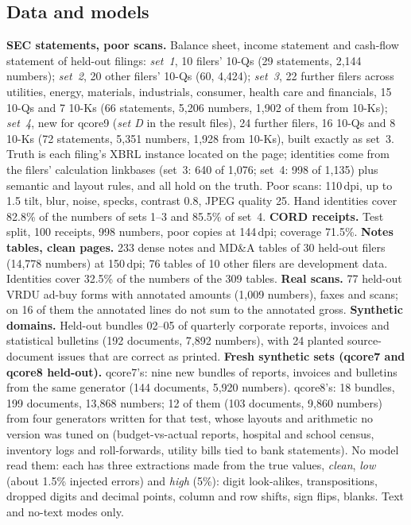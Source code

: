 \documentclass[10pt,twocolumn]{article}
\newcommand{\vq}[1]{\textsf{qcore#1}}
\begin{document}
\subsection{Data and models}
\textbf{SEC statements, poor scans.} Balance sheet, income statement and cash-flow statement of held-out filings: \emph{set~1}, 10 filers' 10-Qs (29 statements, 2,144 numbers); \emph{set~2}, 20 other filers' 10-Qs (60, 4,424); \emph{set~3}, 22 further filers across utilities, energy, materials, industrials, consumer, health care and financials, 15 10-Qs and 7 10-Ks (66 statements, 5,206 numbers, 1,902 of them from 10-Ks); \emph{set~4}, new for \vq{9} (\emph{set D} in the result files), 24 further filers, 16 10-Qs and 8 10-Ks (72 statements, 5,351 numbers, 1,928 from 10-Ks), built exactly as set~3. Truth is each filing's XBRL instance located on the page; identities come from the filers' calculation linkbases (set~3: 640 of 1,076; set~4: 998 of 1,135) plus semantic and layout rules, and all hold on the truth. Poor scans: 110\,dpi, up to 1.5\textdegree{} tilt, blur, noise, specks, contrast 0.8, JPEG quality 25. Hand identities cover 82.8\% of the numbers of sets 1--3 and 85.5\% of set~4.
\textbf{CORD receipts.} Test split, 100 receipts, 998 numbers, poor copies at 144\,dpi; coverage 71.5\%.
\textbf{Notes tables, clean pages.} 233 dense notes and MD\&A tables of 30 held-out filers (14,778 numbers) at 150\,dpi; 76 tables of 10 other filers are development data. Identities cover 32.5\% of the numbers of the 309 tables.
\textbf{Real scans.} 77 held-out VRDU ad-buy forms with annotated amounts (1,009 numbers), faxes and scans; on 16 of them the annotated lines do not sum to the annotated gross.
\textbf{Synthetic domains.} Held-out bundles 02--05 of quarterly corporate reports, invoices and statistical bulletins (192 documents, 7,892 numbers), with 24 planted source-document issues that are correct as printed.
\textbf{Fresh synthetic sets (\vq{7} and \vq{8} held-out).} \vq{7}'s: nine new bundles of reports, invoices and bulletins from the same generator (144 documents, 5,920 numbers). \vq{8}'s: 18 bundles, 199 documents, 13,868 numbers; 12 of them (103 documents, 9,860 numbers) from four generators written for that test, whose layouts and arithmetic no version was tuned on (budget-vs-actual reports, hospital and school census, inventory logs and roll-forwards, utility bills tied to bank statements). No model read them: each has three extractions made from the true values, \emph{clean}, \emph{low} (about 1.5\% injected errors) and \emph{high} (5\%): digit look-alikes, transpositions, dropped digits and decimal points, column and row shifts, sign flips, blanks. Text and no-text modes only.
\end{document}
